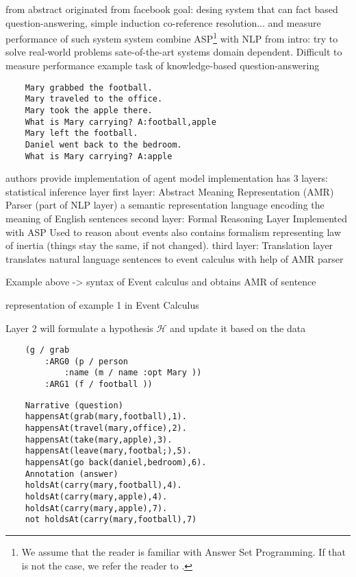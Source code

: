 
from abstract
    originated from facebook
    goal: desing system that can fact based question-answering, simple induction
        co-reference resolution...
        and measure performance of such system
    system combine ASP\footnote{We assume that the reader is familiar with Answer Set Programming. If that is not the case, we refer the reader to \cite{erdem2016applications}.} with NLP
from intro: 
    try to solve real-world problems
    sate-of-the-art systems domain dependent. Difficult to measure performance
    example task of knowledge-based question-answering

\begin{verbatim}
    Mary grabbed the football.
    Mary traveled to the office.
    Mary took the apple there.
    What is Mary carrying? A:football,apple
    Mary left the football.
    Daniel went back to the bedroom.
    What is Mary carrying? A:apple
\end{verbatim}
    
    authors provide implementation of agent model
    implementation has 3 layers: 
    statistical inference layer
    first layer: Abstract Meaning Representation (AMR) Parser (part of NLP layer)
        a semantic representation language encoding the meaning of English sentences \cite{banarescu2013abstract}
    second layer: Formal Reasoning Layer
        Implemented with ASP
        Used to reason about events
        also contains formalism representing law of inertia (things stay the same, if not changed). 
    third layer: Translation layer
        translates natural language sentences to event calculus with help of AMR parser
        
        
    Example above -> syntax of Event calculus and obtains AMR of sentence
    
    representation of example 1 in Event Calculus
    
    Layer 2 will formulate a hypothesis $\mathcal{H}$ and update it based on the data
    
    
\begin{verbatim}
    (g / grab
        :ARG0 (p / person
            :name (m / name :opt Mary ))
        :ARG1 (f / football ))
\end{verbatim}
    

\begin{verbatim}
    Narrative (question)
    happensAt(grab(mary,football),1).
    happensAt(travel(mary,office),2).
    happensAt(take(mary,apple),3).
    happensAt(leave(mary,footbal;),5).
    happensAt(go back(daniel,bedroom),6).
    Annotation (answer)
    holdsAt(carry(mary,football),4).
    holdsAt(carry(mary,apple),4).
    holdsAt(carry(mary,apple),7).
    not holdsAt(carry(mary,football),7)
\end{verbatim}
        
